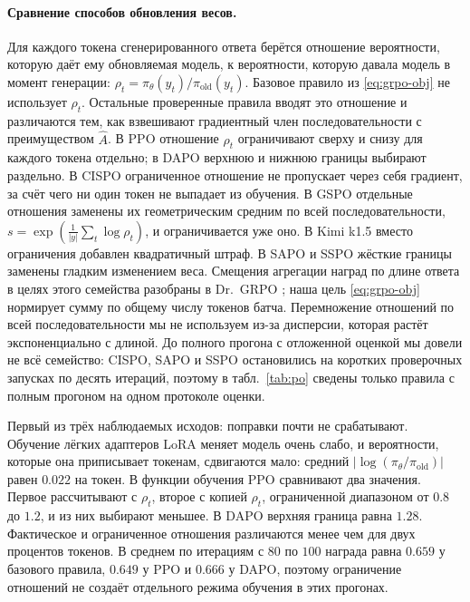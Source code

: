 \documentclass[11pt]{article}
\begin{document}
\paragraph{Сравнение способов обновления весов.} Для каждого токена сгенерированного ответа берётся отношение вероятности, которую даёт ему обновляемая модель, к вероятности, которую давала модель в момент генерации: $\rho_t=\pi_\theta(y_t)/\pi_{\mathrm{old}}(y_t)$. Базовое правило из \eqref{eq:grpo-obj} не использует $\rho_t$. Остальные проверенные правила вводят это отношение и различаются тем, как взвешивают градиентный член последовательности с преимуществом $\hat A$. В PPO \citep{schulman2017ppo} отношение $\rho_t$ ограничивают сверху и снизу для каждого токена отдельно; в DAPO \citep{yu2025dapo} верхнюю и нижнюю границы выбирают раздельно. В CISPO \citep{minimax2025m1} ограниченное отношение не пропускает через себя градиент, за счёт чего ни один токен не выпадает из обучения. В GSPO \citep{zheng2025gspo} отдельные отношения заменены их геометрическим средним по всей последовательности, $s=\exp(\frac1{|y|}\sum_t\log\rho_t)$, и ограничивается уже оно. В Kimi k1.5 \citep{kimi2025k15} вместо ограничения добавлен квадратичный штраф. В SAPO \citep{gao2025sapo} и SSPO \citep{sspo2026} жёсткие границы заменены гладким изменением веса. Смещения агрегации наград по длине ответа в целях этого семейства разобраны в Dr.~GRPO \citep{liu2025drgrpo}; наша цель \eqref{eq:grpo-obj} нормирует сумму по общему числу токенов батча. Перемножение отношений по всей последовательности мы не используем из-за дисперсии, которая растёт экспоненциально с длиной. До полного прогона с отложенной оценкой мы довели не всё семейство: CISPO, SAPO и SSPO остановились на коротких проверочных запусках по десять итераций, поэтому в табл.~\ref{tab:po} сведены только правила с полным прогоном на одном протоколе оценки.

Первый из трёх наблюдаемых исходов: поправки почти не срабатывают. Обучение лёгких адаптеров LoRA меняет модель очень слабо, и вероятности, которые она приписывает токенам, сдвигаются мало: средний $|\log(\pi_\theta/\pi_{\mathrm{old}})|$ равен $0.022$ на токен. В функции обучения PPO сравнивают два значения. Первое рассчитывают с $\rho_t$, второе с копией $\rho_t$, ограниченной диапазоном от $0.8$ до $1.2$, и из них выбирают меньшее. В DAPO верхняя граница равна $1.28$. Фактическое и ограниченное отношения различаются менее чем для двух процентов токенов. В среднем по итерациям с $80$ по $100$ награда равна $0.659$ у базового правила, $0.649$ у PPO и $0.666$ у DAPO, поэтому ограничение отношений не создаёт отдельного режима обучения в этих прогонах.
\end{document}
